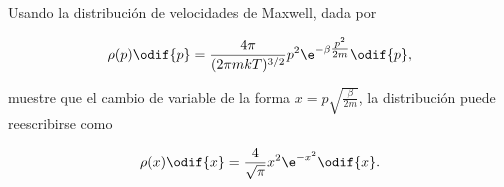 \documentclass[../main.tex]{subfiles}
\begin{document}
\begin{problema}[10]
	Usando la distribución de velocidades de Maxwell, dada por

	\begin{equation*}
		\rho(p)\odif{p} = \dfrac{4\pi}{(2\pi m k T)^{3/2}}p^{2}\e^{-\beta \tfrac{p^{2}}{2m}}\odif{p},
	\end{equation*}

	muestre que el cambio de variable de la forma
	\(x = p\sqrt{\tfrac{\beta}{2m}}\), la distribución puede
	reescribirse como

	\begin{equation*}
		\rho(x)\odif{x} = \dfrac{4}{\sqrt{\pi}}x^{2}\e^{-x^{2}}\odif{x}.
	\end{equation*}
\end{problema}
\end{document}
